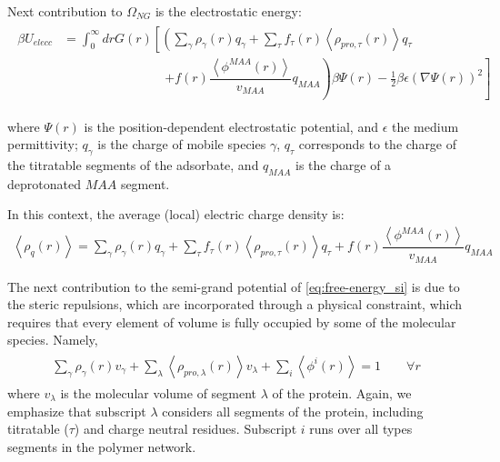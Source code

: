 \documentclass[journal=jacsat,manuscript=suppinfo]{achemso}
\begin{document}

Next contribution to $\Omega_{NG}$ is the electrostatic  energy:
\begin{align}
	\begin{aligned}
		\beta U_{elecc}& = \int_0^\infty drG(r)\left[\left(\sum_{\gamma } \rho_\gamma(r) q_\gamma + \sum_\tau{f_\tau(r) \left<\rho_{pro,\tau}(r)\right> q_\tau}  \right. \right.\\ &\hspace{8em} \left. \left. + f(r)\dfrac{\left<\phi^{MAA}(r)\right>}{v_{MAA}}q_{MAA}\right)\beta\Psi(r) -\frac{1}{2}\beta\epsilon(\nabla\Psi(r))^2 \right]
	\end{aligned}
\end{align} 

\noindent where $\Psi(r)$ is the position-dependent electrostatic potential, and $\epsilon$ the medium permittivity; 
$q_\gamma$ is the charge of  mobile species $\gamma$, $q_\tau$ corresponds to the charge of the titratable segments of the adsorbate, and  $q_{MAA}$ is the charge of a deprotonated $MAA$ segment.

In this context, the average (local) electric charge density is:
\begin{align}
	\left<\rho_q(r)\right> = \sum_{\gamma } {\rho_\gamma(r) q_\gamma + \sum_\tau{f_\tau(r) \left<\rho_{pro,\tau}(r)\right> q_\tau} +  f(r)\dfrac{\left<\phi^{MAA}(r)\right>}{v_{MAA}}q_{MAA}}
	\label{si:eq:rho_charge}
\end{align}

The next contribution to the semi-grand potential of \cref{eq:free-energy_si} is due to the steric repulsions, which are incorporated through a physical constraint, which requires that every element of volume is fully occupied by some of the molecular species.
Namely, 
\begin{align}
	\begin{aligned}
		\sum_{\gamma}\rho_\gamma(r) v_\gamma + \sum_\lambda{\left<\rho_{pro,\lambda}(r)\right>v_\lambda} + \sum_i{\left<\phi^i(r)\right>} = 1\hspace{2em} \forall r
	\end{aligned}
	\label{si:eq:constraint}
\end{align}
\noindent where $v_\lambda$ is the molecular volume of segment $\lambda$ of the protein.
Again, we emphasize that subscript $\lambda$ considers all segments of the protein, including titratable  ($\tau$) and charge neutral residues.
Subscript $i$ runs over  all types segments in the  polymer network.
\end{document}
